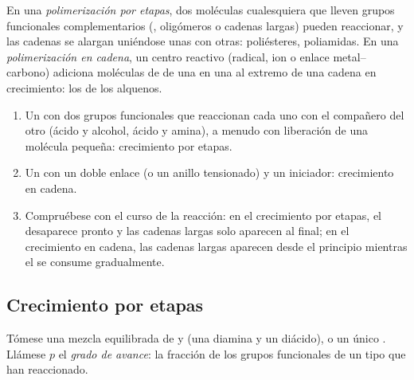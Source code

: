 \begin{definition}\label{def:b2:polymer-synthesis:step-chain}
En una \emph{polimerización por etapas}, dos moléculas cualesquiera que lleven
grupos funcionales complementarios (, oligómeros o cadenas largas) pueden reaccionar, y las cadenas
se alargan uniéndose unas con otras: poliésteres, poliamidas. En una \emph{polimerización en
cadena}, un centro reactivo (radical, ion o enlace metal--carbono)
adiciona moléculas de  de una en una al extremo de una cadena en crecimiento: los  de los alquenos.
\end{definition}

\begin{method}\label{met:b2:polymer-synthesis:classify}
\begin{enumerate}
  \item Un  con dos grupos funcionales que reaccionan cada uno con el compañero del otro (ácido y alcohol,
        ácido y amina), a menudo con liberación de una molécula pequeña: crecimiento por etapas.
  \item Un  con un doble enlace  (o un anillo tensionado) y un iniciador: crecimiento en cadena.
  \item Compruébese con el curso de la reacción: en el crecimiento por etapas, el  desaparece pronto y las cadenas largas
        solo aparecen al final; en el crecimiento en cadena, las cadenas largas aparecen desde el principio mientras el 
        se consume gradualmente.
\end{enumerate}
\end{method}

\subsection*{Crecimiento por etapas}

Tómese una mezcla equilibrada de   y  (una diamina y un diácido), o un único
 . Llámese $p$ el \emph{grado de avance}: la fracción de los grupos funcionales de un
tipo que han reaccionado.

